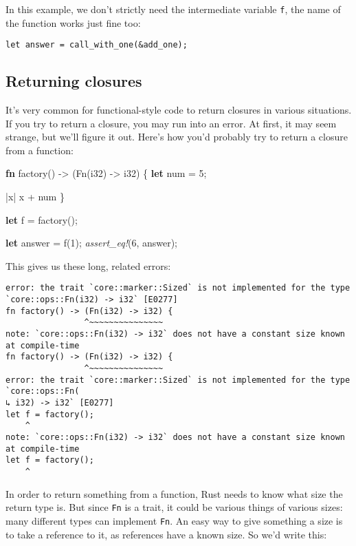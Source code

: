 \documentclass[a4paper,]{book}
\newenvironment{Shaded}{\begin{snugshade}}{\end{snugshade}}
\newcommand{\KeywordTok}[1]{\textcolor[rgb]{0.13,0.29,0.53}{\textbf{{#1}}}}
\newcommand{\DataTypeTok}[1]{\textcolor[rgb]{0.13,0.29,0.53}{{#1}}}
\newcommand{\DecValTok}[1]{\textcolor[rgb]{0.00,0.00,0.81}{{#1}}}
\newcommand{\BuiltInTok}[1]{{#1}}
\newcommand{\PreprocessorTok}[1]{\textcolor[rgb]{0.56,0.35,0.01}{\textit{{#1}}}}
\newcommand{\NormalTok}[1]{{#1}}
\begin{document}
In this example, we don't strictly need the intermediate variable
\texttt{f}, the name of the function works just fine too:

\begin{verbatim}
let answer = call_with_one(&add_one);
\end{verbatim}

\subsection{Returning closures}\label{returning-closures}

It's very common for functional-style code to return closures in various
situations. If you try to return a closure, you may run into an error.
At first, it may seem strange, but we'll figure it out. Here's how you'd
probably try to return a closure from a function:

\begin{Shaded}
\begin{Highlighting}[]
\KeywordTok{fn} \NormalTok{factory() -> (}\BuiltInTok{Fn}\NormalTok{(}\DataTypeTok{i32}\NormalTok{) -> }\DataTypeTok{i32}\NormalTok{) \{}
    \KeywordTok{let} \NormalTok{num = }\DecValTok{5}\NormalTok{;}

    \NormalTok{|x| x + num}
\NormalTok{\}}

\KeywordTok{let} \NormalTok{f = factory();}

\KeywordTok{let} \NormalTok{answer = f(}\DecValTok{1}\NormalTok{);}
\PreprocessorTok{assert_eq!}\NormalTok{(}\DecValTok{6}\NormalTok{, answer);}
\end{Highlighting}
\end{Shaded}

This gives us these long, related errors:

\begin{verbatim}
error: the trait `core::marker::Sized` is not implemented for the type
`core::ops::Fn(i32) -> i32` [E0277]
fn factory() -> (Fn(i32) -> i32) {
                ^~~~~~~~~~~~~~~~
note: `core::ops::Fn(i32) -> i32` does not have a constant size known at compile-time
fn factory() -> (Fn(i32) -> i32) {
                ^~~~~~~~~~~~~~~~
error: the trait `core::marker::Sized` is not implemented for the type `core::ops::Fn(
↳ i32) -> i32` [E0277]
let f = factory();
    ^
note: `core::ops::Fn(i32) -> i32` does not have a constant size known at compile-time
let f = factory();
    ^
\end{verbatim}

In order to return something from a function, Rust needs to know what
size the return type is. But since \texttt{Fn} is a trait, it could be
various things of various sizes: many different types can implement
\texttt{Fn}. An easy way to give something a size is to take a reference
to it, as references have a known size. So we'd write this:
\end{document}

